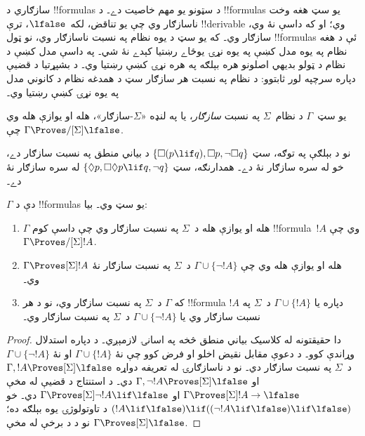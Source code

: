 \documentclass[../../../include/open-logic-section]{subfiles}
\begin{document}


سازګاري د !!{formula}s د سټونو يو مهم خاصيت دے۔ د !!{formula}s يو
سټ هغه وخت ناسازګار وي چې يو تناقض، لکه~$\lfalse$، ترې !!{derivable}
وي؛ او که داسې نۀ وي، سازګار وي۔ که يو سټ د يوه نظام په نسبت
ناسازګار وي، نو ټول !!{formula}s ئې د هغه نظام په يوه مدل کښې په
يوه نړۍ يوځاے رښتيا کېدے نۀ شي۔ په داسې مدل کښې د نظام د ټولو
بديهي اصلونو هره بېلګه په هره نړۍ کښې رښتيا وي۔ د بشپړتيا د
قضيې دپاره سرچپه لور ثابتوو: د نظام په نسبت هر سازګار سټ د
همدغه نظام د کانوني مدل په يوه نړۍ کښې رښتيا وي۔

\begin{defn}
  يو سټ~$\Gamma$ د نظام~$\Sigma$ په نسبت \emph{سازګار}، يا په لنډه
  «$\Sigma$-سازګار»، هله او يوازې هله وي چې $\Gamma
  \Proves/[\Sigma] \lfalse$.
\end{defn}

نو د بېلګې په توګه، سټ $\{ \Box(p \lif q), \Box p, \lnot\Box q \}$
د بياني منطق په نسبت سازګار دے، خو له  سره سازګار نۀ دے۔
همدارنګه، سټ $\{ \Diamond p, \Box\Diamond
p \lif q, \lnot q \}$ له  سره سازګار نۀ دے۔

\begin{prop}
  $\Gamma$ دې د !!{formula}s يو سټ وي۔ بيا:
  \begin{enumerate}
  \item $\Gamma$ هله او يوازې هله د~$\Sigma$ په نسبت سازګار وي چې
    داسې کوم !!{formula}~$!A$ وي چې $\Gamma \Proves/[\Sigma]
    !A$.
  \item {}%
    $\Gamma \Proves[\Sigma] !A$ هله او يوازې هله وي چې $\Gamma \cup \{
    \lnot!A \}$ د~$\Sigma$ په نسبت سازګار نۀ وي۔
  \item {}%
    که $\Gamma$ د~$\Sigma$ په نسبت سازګار وي، نو د هر !!{formula}
    $!A$ دپاره يا $\Gamma \cup \{ !A \}$ د~$\Sigma$ په نسبت
    سازګار وي يا $\Gamma \cup \{ \lnot!A \}$ د~$\Sigma$ په نسبت
    سازګار وي۔
  \end{enumerate}
\end{prop}

\begin{proof}
  دا حقيقتونه له کلاسيک بياني منطق څخه په اسانۍ لازمېږي۔ د
   دپاره استدلال وړاندې کوو۔ د
  دعوې مقابل نقيض اخلو او فرض کوو چې نۀ $\Gamma \cup \{ !A \}$ او نۀ
  $\Gamma \cup \{ \lnot!A \}$ د~$\Sigma$ په نسبت سازګار دي۔ نو د
  ناسازګارۍ له تعريفه دواړه $\Gamma, !A \Proves[\Sigma]
  \lfalse$ او $\Gamma, \lnot !A \Proves[\Sigma] \lfalse$ دي۔ د
  استنتاج د قضيې له مخې $\Gamma \Proves[\Sigma] !A \to \lfalse$ او
  $\Gamma \Proves[\Sigma] \lnot!A \lif \lfalse$ دي۔ خو $(!A \lif
  \lfalse) \lif ((\lnot!A \lif \lfalse) \lif \lfalse)$ د
  تاوتولوژۍ يوه بېلګه ده؛ نو د 
  د  برخې له مخې $\Gamma \Proves[\Sigma] \lfalse$.
\end{proof}
\end{document}
